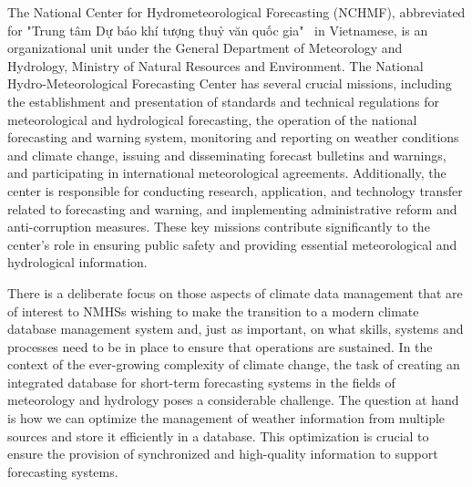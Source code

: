 

The National Center for Hydrometeorological Forecasting (NCHMF),
abbreviated for "Trung tâm Dự báo khí tượng thuỷ văn quốc gia" \ in Vietnamese,
is an organizational unit under the General Department of Meteorology and Hydrology, Ministry of Natural Resources and Environment\cite{NMHS}.
The National Hydro-Meteorological Forecasting Center has several crucial missions, including the establishment and presentation of standards and technical regulations for meteorological and hydrological forecasting, the operation of the national forecasting and warning system, monitoring and reporting on weather conditions and climate change, issuing and disseminating forecast bulletins and warnings, and participating in international meteorological agreements. Additionally, the center is responsible for conducting research, application, and technology transfer related to forecasting and warning, and implementing administrative reform and anti-corruption measures. These key missions contribute significantly to the center's role in ensuring public safety and providing essential meteorological and hydrological information.

There is a deliberate focus on those aspects of climate data management that are of interest to
NMHSs wishing to make the transition to a modern climate database management system and,
just as important, on what skills, systems and processes need to be in place to ensure that
operations are sustained. In the context of the ever-growing complexity of climate change, the task of creating an integrated database for short-term forecasting systems in the fields of meteorology and hydrology poses a considerable challenge. The question at hand is how we can optimize the management of weather information from multiple sources and store it efficiently in a database. This optimization is crucial to ensure the provision of synchronized and high-quality information to support forecasting systems.

